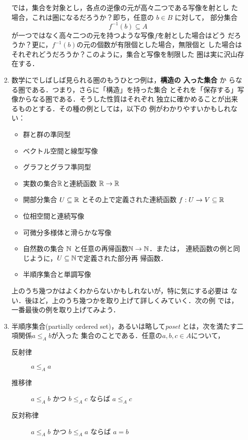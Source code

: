 \begin{enumerate}
       では，集合を対象とし，各点の逆像の元が高々二つである写像を射とし
       た場合，これは圏になるだろうか？即ち，任意の $b \in B$ に対して，
       部分集合
       \[
	f^{-1}(b) \subseteq A
       \]
       が一つではなく高々二つの元を持つような写像$f$を射とした場合はどう
       だろうか？更に，$f^{-1}(b)$の元の個数が有限個とした場合，無限個と
       した場合はそれぞれどうだろうか？このように，集合と写像を制限した
       圏は実に沢山存在する．
 \item 数学にでしばしば見られる圏のもうひとつ例は，{\bfseries 構造の
       入った集合}
       か
       らなる圏である．つまり，さらに「構造」を持った集合
       とそれを「保存する」写像からなる圏である．そうした性質はそれぞれ
       独立に確かめることが出来るものとする．その種の例としては，以下の
       例がわかりやすいかもしれない：
       \begin{itemize}
	\item 群と群の準同型
	\item ベクトル空間と線型写像
	\item グラフとグラフ準同型
	\item 実数の集合$\mathbb{R}$と連続函数
	      $\mathbb{R}\to\mathbb{R}$
	\item 開部分集合 $U \subseteq \mathbb{R}$ とその上で定義された連続函数
	      $f : U \to V \subseteq \mathbb{R} $
	\item 位相空間と連続写像
	\item 可微分多様体と滑らかな写像
	\item 自然数の集合 $\mathbb{N}$ と任意の再帰函数$\mathbb{N} \to \mathbb{N}$．または，
	      連続函数の例と同じように，$U\subseteq\mathbb{N}$で定義された部分再
	      帰函数．
	\item 半順序集合と単調写像
       \end{itemize}
       上のうち幾つかはよくわからないかもしれないが，特に気にする必要は
       ない．後ほど，上のうち幾つかを取り上げて詳しくみていく．次の例
       では，一番最後の例を取り上げてみよう．
 \item 半順序集合(partially ordered set)，あるいは略して{\itshape poset}
        とは，次を満たす二項関係$a \leq_A b$が入った
       集合のことである．任意の$a,b,c\in A$について，
       \begin{description}
	\item[反射律] $a\leq_A a$
	\item[推移律] $a\leq_A b$ かつ $b \leq_A c $ ならば $a \leq_A c$
	\item[反対称律] $a \leq_A b$ かつ $b \leq_A a$ ならば $a=b$
       \end{description}


\end{enumerate}
